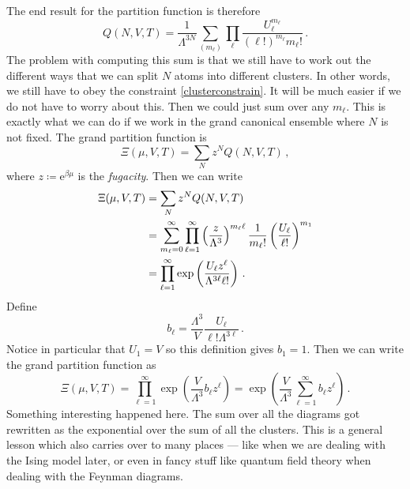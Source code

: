 \documentclass{article}
\theoremstyle{plain}\theoremheaderfont{\normalfont\bfseries}\theorembodyfont{\rmfamily}\theoremseparator{.}\newtheorem*{thm}{Theorem}\newtheorem*{law}{Law}\newtheorem*{pos}{Postulate}
\numberwithin{equation}{section}
\newcommand{\ee}{\mathrm{e}}
\begin{document}
    The end result for the partition function is therefore
    \begin{equation}
        Q(N,V,T)=\frac{1}{\Lambda^{3N}}\sum_{(m_\ell)}\prod_{\ell}\frac{U_\ell^{m_\ell}}{(\ell!)^{m_\ell}m_\ell!}\,.
    \end{equation}
    The problem with computing this sum is that we still have to work out the different ways that we can split \(N\) atoms into different clusters. In other words, we still have to obey the constraint \cref{clusterconstrain}. It will be much easier if we do not have to worry about this. Then we could just sum over any \(m_\ell\). This is exactly what we can do if we work in the grand canonical ensemble where \(N\) is not fixed. The grand partition function is
    \begin{equation}
        \Xi(\mu,V,T)=\sum_N z^N Q(N,V,T)\,,
    \end{equation}
    where \(z\coloneqq \ee^{\beta\mu}\) is the \textit{fugacity}. Then we can write
    \begin{align}
        \Xi(\mu,V,T)&=\sum_N z^N Q(N,V,T)\notag\\
        &=\sum_{m_\ell=0}^{\infty}\prod_{\ell=1}^{\infty}\left(\frac{z}{\Lambda^3}\right)^{m_\ell \ell}\frac{1}{m_\ell!}\left(\frac{U_\ell}{\ell!}\right)^{m_1}\notag\\
        &=\prod_{\ell=1}^{\infty}\exp\left(\frac{U_\ell z^\ell}{\Lambda^{3\ell}\ell!}\right)\,.
    \end{align}
    Define
    \begin{equation}
        b_\ell=\frac{\Lambda^3}{V}\frac{U_\ell}{\ell!\Lambda^{3\ell}}\,.
    \end{equation}
    Notice in particular that \(U_1=V\) so this definition gives \(b_1=1\). Then we can write the grand partition function as
    \begin{equation}\label{cluster_expansion_exp_sum}
        \Xi(\mu,V,T)=\prod_{\ell=1}^{\infty}\exp\left(\frac{V}{\Lambda^3}b_\ell z^\ell\right)=\exp\left(\frac{V}{\Lambda^3}\sum_{\ell=1}^{\infty}b_\ell z^\ell\right)\,.
    \end{equation}
    Something interesting happened here. The sum over all the diagrams got rewritten as the exponential over the sum of all the clusters. This is a general lesson which also carries over to many places --- like when we are dealing with the Ising model later, or even in fancy stuff like quantum field theory when dealing with the Feynman diagrams.
\end{document}
